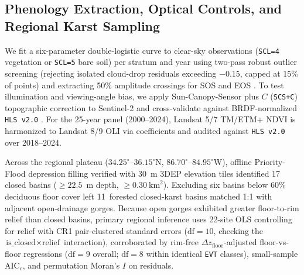 \subsection{Phenology Extraction, Optical Controls, and Regional Karst Sampling}
We fit a six-parameter double-logistic curve to clear-sky observations (\texttt{SCL=4} vegetation or \texttt{SCL=5} bare soil) per stratum and year using two-pass robust outlier screening (rejecting isolated cloud-drop residuals exceeding $-0.15$, capped at 15\% of points) and extracting 50\% amplitude crossings for SOS and EOS \citep{bolton2020}. To test illumination and viewing-angle bias, we apply Sun-Canopy-Sensor plus $C$ (\texttt{SCS+C}) topographic correction \citep{soenen2005} to Sentinel-2 and cross-validate against BRDF-normalized \texttt{HLS v2.0} \citep{claverie2018}. For the 25-year panel (2000--2024), Landsat 5/7 TM/ETM+ NDVI is harmonized to Landsat 8/9 OLI via \citet{roy2016} coefficients and audited against \texttt{HLS v2.0} over 2018--2024.

Across the regional plateau ($34.25^\circ$--$36.15^\circ$N, $86.70^\circ$--$84.95^\circ$W), offline Priority-Flood depression filling \citep{barnes2014} verified with 30~m 3DEP elevation tiles identified 17 closed basins ($\ge 22.5$~m depth, $\ge 0.30~\text{km}^2$). Excluding six basins below 60\% deciduous floor cover left 11~forested closed-karst basins matched 1:1 with adjacent open-drainage gorges. Because open gorges exhibited greater floor-to-rim relief than closed basins, primary regional inference uses 22-site OLS controlling for relief with CR1 pair-clustered standard errors ($\text{df}=10$, checking the $\text{is\_closed} \times \text{relief}$ interaction), corroborated by rim-free $\Delta z_{\text{floor}}$-adjusted floor-vs-floor regressions ($\text{df}=9$ overall; $\text{df}=8$ within identical \texttt{EVT} classes), small-sample $\text{AIC}_c$, and permutation Moran's $I$ on residuals.

